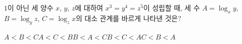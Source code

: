 $1$이 아닌 세 양수 $x$, $y$, $z$에 대하여 $x^3=y^4=z^5$이 성립할 때, 세 수 $A=\log_x y$, $B=\log_y z$, $C=\log_z x$의 대소 관계를 바르게 나타낸 것은?
\begin{choices32}{$A<B<C$}{$A<C<B$}{$B<A<C$}{$B<C<A$}{$C<B<A$}\end{choices32}

